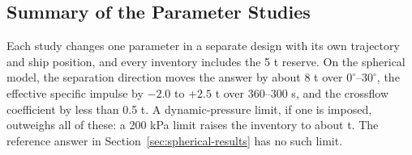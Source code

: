 \subsection{Summary of the Parameter Studies}
Each study changes one parameter in a separate design with its own trajectory and ship position, and every inventory includes the 5 t reserve. On the spherical model, the separation direction moves the answer by about 8 t over $0^\circ$--$30^\circ$, the effective specific impulse by $-2.0$ to $+2.5$ t over 360--300 s, and the crossflow coefficient by less than 0.5 t. A dynamic-pressure limit, if one is imposed, outweighs all of these: a 200 kPa limit raises the inventory to about \QcapTwoHundred{} t. The reference answer in Section~\ref{sec:spherical-results} has no such limit.
